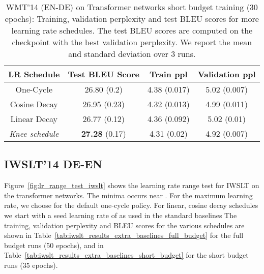 \documentclass[twoside,11pt]{article}
\newcommand{\lrschedule}{\textit{Knee schedule}}
\begin{document}
\begin{table}[!th]
\small
\centering
\caption{WMT'14 (EN-DE) on Transformer networks short budget training (30 epochs): Training, validation perplexity and test BLEU scores for more learning rate schedules. The test BLEU scores are computed on the checkpoint with the best validation perplexity. We report the mean and standard deviation over 3 runs.}
\label{tab:wmt_results_extra_baselines_short_budget}
\begin{tabular}{cccc}
  \toprule
  LR Schedule    & Test BLEU Score  & Train ppl & Validation ppl  \\ 
  \midrule
  One-Cycle      &  26.80 (0.2) & 4.38 (0.017)  & 5.02 (0.007)    \\
  Cosine Decay  &  26.95 (0.23) & 4.32 (0.013)  & 4.99 (0.011)   \\
  Linear Decay  & 26.77  (0.12) & 4.36 (0.092)  & 5.02 (0.01)  \\
  \lrschedule{} & \textbf{27.28} (0.17)  & 4.31 (0.02)   & 4.92 (0.007)    \\ 
  \bottomrule
\end{tabular}

\end{table}




\vspace{2in}
\subsection{IWSLT'14 DE-EN}
Figure~\ref{fig:lr_range_test_iwslt} shows the learning rate range test for IWSLT on the transformer networks. The minima occurs near . For the maximum learning rate, we choose  for the default one-cycle policy. For linear, cosine decay schedules we start with a seed learning rate of  as used in the standard baselines The training, validation perplexity and BLEU scores for the various schedules are shown in Table~\ref{tab:iwslt_results_extra_baselines_full_budget} for the full budget runs (50 epochs), and in Table~\ref{tab:iwslt_results_extra_baselines_short_budget} for the short budget runs (35 epochs).
\end{document}

